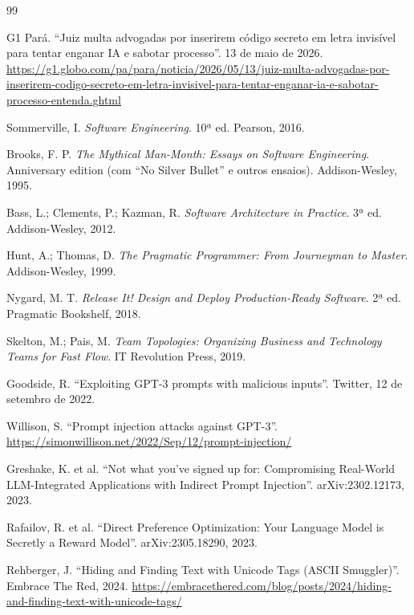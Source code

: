 \documentclass[11pt,a4paper]{article}
\begin{document}
\clearpage
{\small
\begin{thebibliography}{99}
\setlength{\itemsep}{0.3em}
\setlength{\parsep}{0pt}

G1 Pará. \enquote{Juiz multa advogadas por inserirem código secreto em letra invisível para tentar enganar IA e sabotar processo}. 13 de maio de 2026. \url{https://g1.globo.com/pa/para/noticia/2026/05/13/juiz-multa-advogadas-por-inserirem-codigo-secreto-em-letra-invisivel-para-tentar-enganar-ia-e-sabotar-processo-entenda.ghtml}

Sommerville, I. \emph{Software Engineering}. 10ª ed. Pearson, 2016.

Brooks, F. P. \emph{The Mythical Man-Month: Essays on Software Engineering}. Anniversary edition (com \enquote{No Silver Bullet} e outros ensaios). Addison-Wesley, 1995.

Bass, L.; Clements, P.; Kazman, R. \emph{Software Architecture in Practice}. 3ª ed. Addison-Wesley, 2012.

Hunt, A.; Thomas, D. \emph{The Pragmatic Programmer: From Journeyman to Master}. Addison-Wesley, 1999.

Nygard, M. T. \emph{Release It! Design and Deploy Production-Ready Software}. 2ª ed. Pragmatic Bookshelf, 2018.

Skelton, M.; Pais, M. \emph{Team Topologies: Organizing Business and Technology Teams for Fast Flow}. IT Revolution Press, 2019.

Goodside, R. \enquote{Exploiting GPT-3 prompts with malicious inputs}. Twitter, 12 de setembro de 2022.

Willison, S. \enquote{Prompt injection attacks against GPT-3}. \url{https://simonwillison.net/2022/Sep/12/prompt-injection/}

Greshake, K. et al. \enquote{Not what you've signed up for: Compromising Real-World LLM-Integrated Applications with Indirect Prompt Injection}. arXiv:2302.12173, 2023.

Rafailov, R. et al. \enquote{Direct Preference Optimization: Your Language Model is Secretly a Reward Model}. arXiv:2305.18290, 2023.

Rehberger, J. \enquote{Hiding and Finding Text with Unicode Tags (ASCII Smuggler)}. Embrace The Red, 2024. \url{https://embracethered.com/blog/posts/2024/hiding-and-finding-text-with-unicode-tags/}


\end{thebibliography}}
\end{document}

